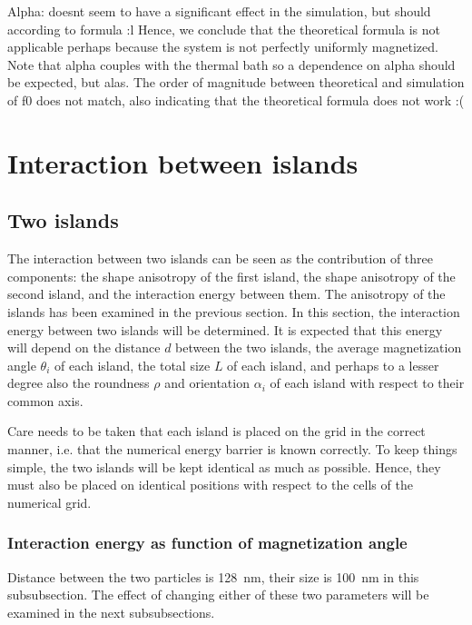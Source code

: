 \documentclass[12pt,a4paper]{article}
\begin{document}
Alpha: doesnt seem to have a significant effect in the simulation, but should according to formula :l Hence, we conclude that the theoretical formula is not applicable perhaps because the system is not perfectly uniformly magnetized. Note that alpha couples with the thermal bath so a dependence on alpha should be expected, but alas. The order of magnitude between theoretical and simulation of f0 does not match, also indicating that the theoretical formula does not work :( 



\clearpage
\section{Interaction between islands}
\subsection{Two islands}
The interaction between two islands can be seen as the contribution of three components: the shape anisotropy of the first island, the shape anisotropy of the second island, and the interaction energy between them. The anisotropy of the islands has been examined in the previous section. In this section, the interaction energy between two islands will be determined. It is expected that this energy will depend on the distance $d$ between the two islands, the average magnetization angle $\theta_i$ of each island, the total size $L$ of each island, and perhaps to a lesser degree also the roundness $\rho$ and orientation $\alpha_i$ of each island with respect to their common axis. \par
Care needs to be taken that each island is placed on the grid in the correct manner, i.e. that the numerical energy barrier is known correctly. To keep things simple, the two islands will be kept identical as much as possible. Hence, they must also be placed on identical positions with respect to the cells of the numerical grid.

\subsubsection{Interaction energy as function of magnetization angle}
Distance between the two particles is \SI{128}{\nano\metre}, their size is \SI{100}{\nano\metre} in this subsubsection. The effect of changing either of these two parameters will be examined in the next subsubsections.
\end{document}
